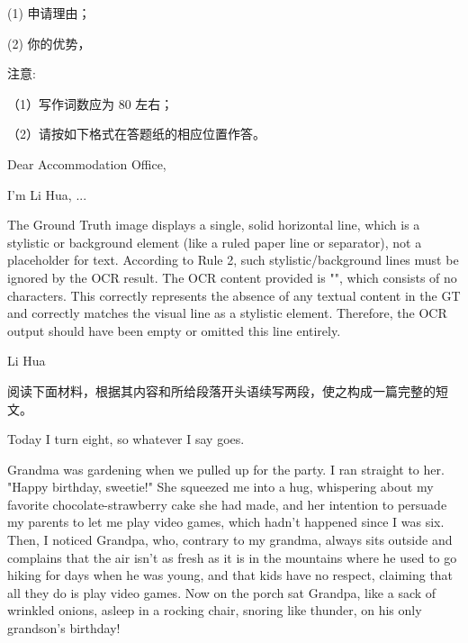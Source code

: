 \documentclass{英语试卷}
\begin{document}
\par (1) 申请理由；\par
\par (2) 你的优势，\par
\par 注意:\par
\par （1）写作词数应为 80 左右；\par
\par （2）请按如下格式在答题纸的相应位置作答。\par
\par Dear Accommodation Office,\par
\par I'm Li Hua, ...\par
\par The Ground Truth image displays a single, solid horizontal line, which is a stylistic or background element (like a ruled paper line or separator), not a placeholder for text. According to Rule 2, such stylistic/background lines must be ignored by the OCR result. The OCR content provided is "", which consists of no characters. This correctly represents the absence of any textual content in the GT and correctly matches the visual line as a stylistic element. Therefore, the OCR output should have been empty or omitted this line entirely.\par
\par Li Hua\par
{}
\par 阅读下面材料，根据其内容和所给段落开头语续写两段，使之构成一篇完整的短文。\par
\par Today I turn eight, so whatever I say goes.\par
\par Grandma was gardening when we pulled up for the party. I ran straight to her. "Happy birthday, sweetie!" She squeezed me into a hug, whispering about my favorite chocolate-strawberry cake she had made, and her intention to persuade my parents to let me play video games, which hadn't happened since I was six. Then, I noticed Grandpa, who, contrary to my grandma, always sits outside and complains that the air isn't as fresh as it is in the mountains where he used to go hiking for days when he was young, and that kids have no respect, claiming that all they do is play video games. Now on the porch sat Grandpa, like a sack of wrinkled onions, asleep in a rocking chair, snoring like thunder, on his only grandson's birthday!\par
\end{document}
